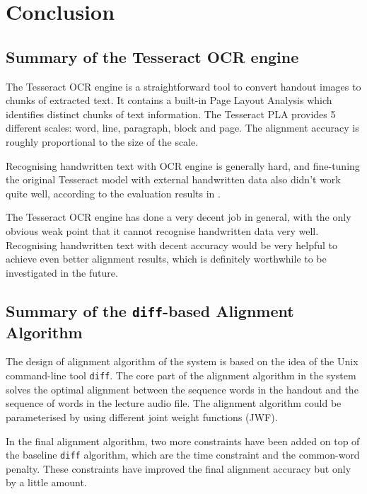 
\chapter{Conclusion}
\label{chap:conclusion}

\ifpdf
    \graphicspath{{Chapter10/Figs/Raster/}{Chapter10/Figs/PDF/}{Chapter10/Figs/}}
\else
    \graphicspath{{Chapter10/Figs/Vector/}{Chapter10/Figs/}}
\fi



\section{Summary of the Tesseract OCR engine}

The Tesseract OCR engine is a straightforward tool to convert handout images to chunks of extracted text. It contains a built-in Page Layout Analysis which identifies distinct chunks of text information. The Tesseract PLA provides 5 different scales: word, line, paragraph, block and page. The alignment accuracy is roughly proportional to the size of the scale.

Recognising handwritten text with OCR engine is generally hard, and fine-tuning the original Tesseract model with external handwritten data also didn't work quite well, according to the evaluation results in . 

The Tesseract OCR engine has done a very decent job in general, with the only obvious weak point that it cannot recognise handwritten data very well. Recognising handwritten text with decent accuracy would be very helpful to achieve even better alignment results, which is definitely worthwhile to be investigated in the future.

\section{Summary of the \texttt{diff}-based Alignment Algorithm}

The design of alignment algorithm of the system is based on the idea of the Unix command-line tool \texttt{diff}. The core part of the alignment algorithm in the system solves the optimal alignment between the sequence words in the handout and the sequence of words in the lecture audio file. The alignment algorithm could be parameterised by using different joint weight functions (JWF).

In the final alignment algorithm, two more constraints have been added on top of the baseline \texttt{diff} algorithm, which are the time constraint and the common-word penalty. These constraints have improved the final alignment accuracy but only by a little amount.


